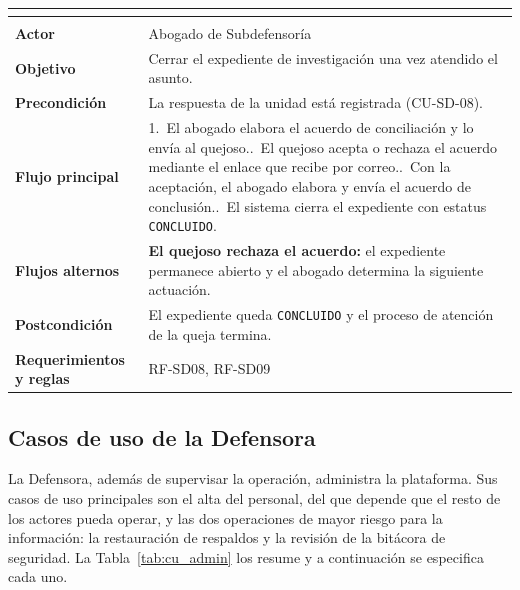 \begingroup
{}
\small
\renewcommand{\arraystretch}{1.25}
\setlength{\tabcolsep}{4pt}
\begin{longtable}{|L{3.2cm}|L{12.4cm}|}
	\hline
	 \\
	\hline
	\endfirsthead
	\hline
	 \\
	\hline
	\endhead
	\textbf{Actor} & Abogado de Subdefensoría \\ \hline
	\textbf{Objetivo} & Cerrar el expediente de investigación una vez atendido el asunto. \\ \hline
	\textbf{Precondición} & La respuesta de la unidad está registrada (CU-SD-08). \\ \hline
	\textbf{Flujo principal} & 1.~El abogado elabora el acuerdo de conciliación y lo envía al quejoso..~El quejoso acepta o rechaza el acuerdo mediante el enlace que recibe por correo..~Con la aceptación, el abogado elabora y envía el acuerdo de conclusión..~El sistema cierra el expediente con estatus \texttt{CONCLUIDO}. \\ \hline
	\textbf{Flujos alternos} & \textbf{El quejoso rechaza el acuerdo:} el expediente permanece abierto y el abogado determina la siguiente actuación. \\ \hline
	\textbf{Postcondición} & El expediente queda \texttt{CONCLUIDO} y el proceso de atención de la queja termina. \\ \hline
	\textbf{Requerimientos y reglas} & RF-SD08, RF-SD09 \\ \hline
\end{longtable}
\endgroup

\subsection{Casos de uso de la Defensora}
La Defensora, además de supervisar la operación, administra la plataforma. Sus casos de uso principales son el alta del personal, del que depende que el resto de los actores pueda operar, y las dos operaciones de mayor riesgo para la información: la restauración de respaldos y la revisión de la bitácora de seguridad. La Tabla~\ref{tab:cu_admin} los resume y a continuación se especifica cada uno.

